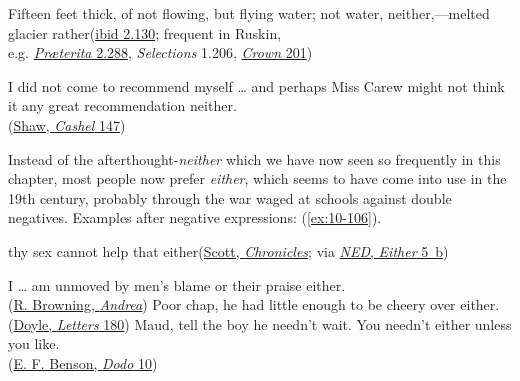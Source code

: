 Fifteen feet thick, of not flowing, but flying water; not water, neither,---melted glacier rather\hfill(\href{https://archive.org/details/in.ernet.dli.2015.95622/page/n141/mode/2up?q=%22fifteen+feet+thick%22&view=theater}{ibid 2.130}; frequent in Ruskin,\\\hfill e.g. \href{https://archive.org/details/in.ernet.dli.2015.95622/page/n301/mode/2up?q=%22hearing+no+word%22&view=theater}{\textit{Præterita} 2.288}, \textit{Selections} 1.206, \href{https://archive.org/details/crownofwildolive00ruskiala/page/122/mode/2up?view=theater&q=%22not+those%22}{\textit{Crown} 201}) %

\ex I did not come to recommend myself {\dots} and perhaps Miss Carew might not think it any great recommendation neither.\\\hfill(\href{https://archive.org/details/cashelbyronsprof00shawuoft/page/n173/mode/2up?q=%22come+to+recommend+myself%22&view=theater}{Shaw, \textit{Cashel} 147}) %
\z
\z

Instead of the afterthought-\textit{neither} which we have now seen so frequently in this chapter, most people now prefer \textit{either}, which seems to have come into use in the 19th century, probably through the war waged at schools against double negatives. Examples after negative expressions: (\ref{ex:10-106}).

\ea \label{ex:10-106}
\ea thy sex cannot help that either\hfill(\href{https://archive.org/details/chroniclesofcano03scot/page/240/mode/2up?view=theater&q=%22thy+sex+cannot%22}{Scott, \textit{Chronicles}}; via \href{https://archive.org/details/oed03arch/page/n819/mode/2up?view=theater}{\textit{NED}, \textit{Either} 5~b}) %

\ex I {\dots} am unmoved by men's blame or their praise either.\\\hfill(\href{https://archive.org/details/cu31924013442631/page/132/mode/2up?q=%22am+unmoved+by%22&view=theater}{R. Browning, \textit{Andrea}})
\ex Poor chap, he had little enough to be cheery over either.\\\hfill(\href{https://archive.org/details/cu31924013342781/page/n195/mode/2up?q=%22cheery+over+either%22&view=theater}{Doyle, \textit{Letters} 180})
\ex Maud, tell the boy he needn't wait. You needn't either unless you like.\\\hfill(\href{https://archive.org/details/dododetailofday00bensuoft/page/12/mode/2up?view=theater&q=%22tell+the+boy%22}{E. F. Benson, \textit{Dodo} 10}) %
\z
\z

